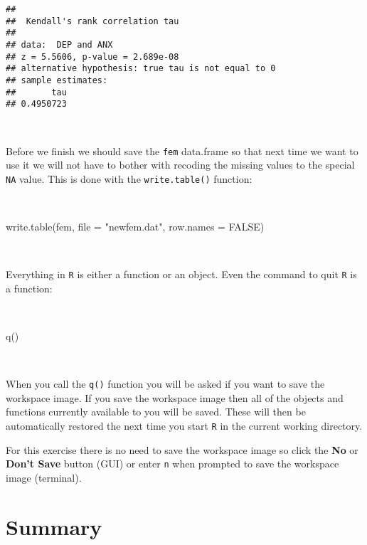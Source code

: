 \documentclass[
  12pt,
  a4paper]{book}
\newenvironment{Shaded}{\begin{snugshade}}{\end{snugshade}}
\newcommand{\AttributeTok}[1]{\textcolor[rgb]{0.77,0.63,0.00}{#1}}
\newcommand{\ConstantTok}[1]{\textcolor[rgb]{0.00,0.00,0.00}{#1}}
\newcommand{\FunctionTok}[1]{\textcolor[rgb]{0.00,0.00,0.00}{#1}}
\newcommand{\NormalTok}[1]{#1}
\newcommand{\StringTok}[1]{\textcolor[rgb]{0.31,0.60,0.02}{#1}}
\begin{document}
\begin{verbatim}
## 
##  Kendall's rank correlation tau
## 
## data:  DEP and ANX
## z = 5.5606, p-value = 2.689e-08
## alternative hypothesis: true tau is not equal to 0
## sample estimates:
##       tau 
## 0.4950723
\end{verbatim}

~

Before we finish we should save the \texttt{fem} data.frame so that next time we want to use it we will not have to bother with recoding the missing values to the special \texttt{NA} value. This is done with the \texttt{write.table()} function:

~

\begin{Shaded}
\begin{Highlighting}[]
\FunctionTok{write.table}\NormalTok{(fem, }\AttributeTok{file =} \StringTok{"newfem.dat"}\NormalTok{, }\AttributeTok{row.names =} \ConstantTok{FALSE}\NormalTok{)}
\end{Highlighting}
\end{Shaded}

~

Everything in \texttt{R} is either a function or an object. Even the command to quit \texttt{R} is a function:

~

\begin{Shaded}
\begin{Highlighting}[]
\FunctionTok{q}\NormalTok{()}
\end{Highlighting}
\end{Shaded}

~

When you call the \texttt{q()} function you will be asked if you want to save the workspace image. If you save the workspace image then all of the objects and functions currently available to you will be saved. These will then be automatically restored the next time you start \texttt{R} in the current working directory.

For this exercise there is no need to save the workspace image so click the \textbf{No} or \textbf{Don't Save} button (GUI) or enter \texttt{n} when prompted to save the workspace image (terminal).

\hypertarget{summary}{%
\section{Summary}\label{summary}}
\end{document}
